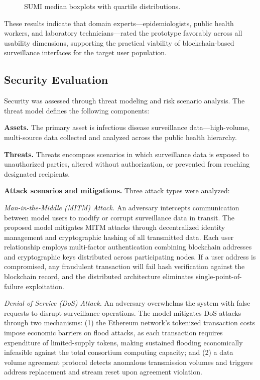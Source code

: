 \documentclass[AMA,LATO1COL]{WileyNJD-v2}
\begin{document}
\begin{figure}[!ht]
\centering
{}
\caption{SUMI median boxplots with quartile distributions.}\label{fig:sumi_box}
\end{figure}

These results indicate that domain experts---epidemiologists, public health workers, and laboratory technicians---rated the prototype favorably across all usability dimensions, supporting the practical viability of blockchain-based surveillance interfaces for the target user population.

\subsection{Security Evaluation}\label{subsec:security}

Security was assessed through threat modeling and risk scenario analysis. The threat model defines the following components:

\textbf{Assets.} The primary asset is infectious disease surveillance data---high-volume, multi-source data collected and analyzed across the public health hierarchy.

\textbf{Threats.} Threats encompass scenarios in which surveillance data is exposed to unauthorized parties, altered without authorization, or prevented from reaching designated recipients.

\textbf{Attack scenarios and mitigations.} Three attack types were analyzed:

\textit{Man-in-the-Middle (MITM) Attack.} An adversary intercepts communication between model users to modify or corrupt surveillance data in transit. The proposed model mitigates MITM attacks through decentralized identity management and cryptographic hashing of all transmitted data. Each user relationship employs multi-factor authentication combining blockchain addresses and cryptographic keys distributed across participating nodes. If a user address is compromised, any fraudulent transaction will fail hash verification against the blockchain record, and the distributed architecture eliminates single-point-of-failure exploitation.

\textit{Denial of Service (DoS) Attack.} An adversary overwhelms the system with false requests to disrupt surveillance operations. The model mitigates DoS attacks through two mechanisms: (1) the Ethereum network's tokenized transaction costs impose economic barriers on flood attacks, as each transaction requires expenditure of limited-supply tokens, making sustained flooding economically infeasible against the total consortium computing capacity; and (2) a data volume agreement protocol detects anomalous transmission volumes and triggers address replacement and stream reset upon agreement violation.
\end{document}
